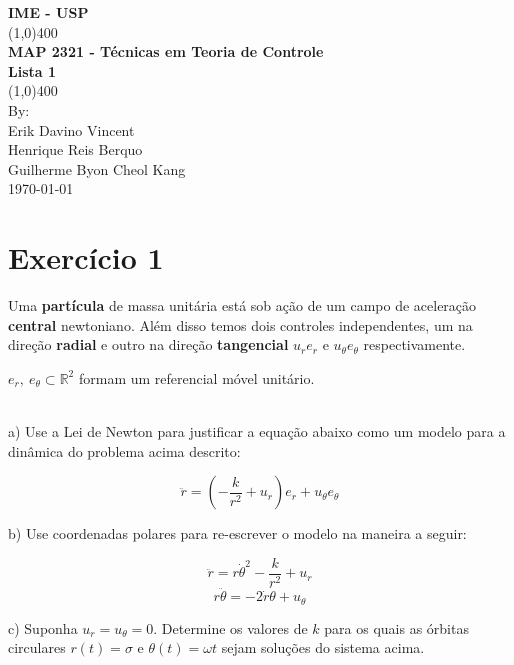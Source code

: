 \documentclass[11pt]{article}
\begin{document}
\begin{titlepage}
\begin{center}
\vspace{1cm}
\Large{\textbf{IME - USP}}\\
\vfill
\line(1,0){400}\\[1mm]
\huge{\textbf{MAP 2321 - Técnicas em Teoria de Controle}}\\[3mm]
\Large{\textbf{Lista 1}}\\[1mm]
\line(1,0){400}\\
\vfill
By:\\
Erik Davino Vincent\\
Henrique Reis Berquo\\
Guilherme Byon Cheol Kang\\
\today\\

\end{center}
\end{titlepage}

\setcounter{page}{1}

\section*{Exercício 1}

Uma \textbf{partícula} de massa unitária está sob ação de um campo de aceleração \textbf{central} newtoniano. Além disso temos dois controles independentes, um na direção \textbf{radial} e outro na direção \textbf{tangencial} $u_re_r$ e $u_{\theta}e_{\theta}$ respectivamente.\\

\begin{small}
$e_r,\ e_{\theta}\subset\mathbb{R}^2$ formam um referencial móvel unitário.
\end{small}\\

a) Use a Lei de Newton para justificar a equação abaixo como um modelo para a dinâmica do problema acima descrito:

$$\ddot{r} = (-\frac{k}{r^2} + u_r)e_r + u_{\theta}e_{\theta}$$

b) Use coordenadas polares para re-escrever o modelo na maneira a seguir:

$$\ddot{r} = r\dot{\theta}^2-\frac{k}{r^2} + u_r$$
$$r\ddot{\theta} = -2\dot{r}\dot{\theta} + u_{\theta}$$

c) Suponha $u_r = u_{\theta} = 0$. Determine os valores de $k$ para os quais as órbitas circulares $r(t) = \sigma$ e $\theta(t) = \omega t$ sejam soluções do sistema acima.\\
\end{document}
